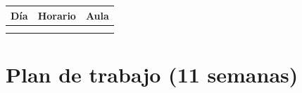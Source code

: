\documentclass[12pt]{article}
\begin{document}
	\begin{center}
		\renewcommand{\arraystretch}{1.3}
		\begin{tabular}{|c|c|c|}
			\hline
			\textbf{Día} & \textbf{Horario} & \textbf{Aula} \\
			\hline
			\underline{\makebox[2.8cm][c]{Martes}} &
			\underline{\makebox[2.8cm][c]{8--10}} &
			\underline{\makebox[2.8cm][c]{A-505}} \\
			\hline
			\underline{\makebox[2.8cm][c]{Jueves}} &
			\underline{\makebox[2.8cm][c]{8--11}} &
			\underline{\makebox[2.8cm][c]{A-505}} \\
			\hline
		\end{tabular}
	\end{center}
	
	
	\vspace{1em}


\section*{Plan de trabajo (11 semanas)}
\end{document}
